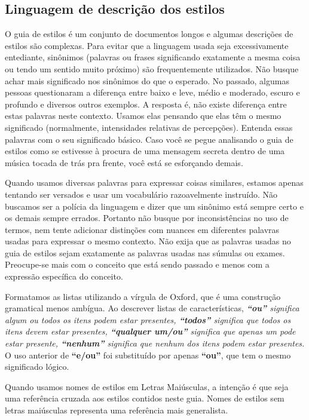 \subsection*{Linguagem de descrição dos estilos}
O guia de estilos é um conjunto de documentos longos e algumas descrições de estilos são complexas. Para evitar que a linguagem usada seja excessivamente entediante, sinônimos (palavras ou frases significando exatamente a mesma coisa ou tendo um sentido muito próximo) são frequentemente utilizados. Não busque achar mais significado nos sinônimos do que o esperado. No passado, algumas pessoas questionaram a diferença entre baixo e leve, médio e moderado, escuro e profundo e diversos outros exemplos. A resposta é, não existe diferença entre estas palavras neste contexto. Usamos elas pensando que elas têm o mesmo significado (normalmente, intensidades relativas de percepções). Entenda essas palavras com o seu significado básico. Caso você se pegue analisando o guia de estilos como se estivesse à procura de uma mensagem secreta dentro de uma música tocada de trás pra frente, você está se esforçando demais.

Quando usamos diversas palavras para expressar coisas similares, estamos apenas tentando ser versados e usar um vocabulário razoavelmente instruído. Não buscamos ser a polícia da linguagem e dizer que um sinônimo está sempre certo e os demais sempre errados. Portanto não busque por inconsistências no uso de termos, nem tente adicionar distinções com nuances em diferentes palavras usadas para expressar o mesmo contexto. Não exija que as palavras usadas no guia de estilos sejam exatamente as palavras usadas nas súmulas ou exames. Preocupe-se mais com o conceito que está sendo passado e menos com a expressão específica do conceito.

Formatamos as listas utilizando a vírgula de Oxford, que é uma construção gramatical menos ambígua. Ao descrever listas de características, \textit{\textbf{“ou”} significa algum ou todos os itens podem estar presentes, \textbf{“todos”} significa que todos os itens devem estar presentes, \textbf{“qualquer um/ou”} significa que apenas um pode estar presente, \textbf{“nenhum”} significa que nenhum dos itens podem estar presentes.} O uso anterior de \textbf{“e/ou”} foi substituído por apenas \textbf{“ou”}, que tem o mesmo significado lógico.

Quando usamos nomes de estilos em Letras Maiúsculas, a intenção é que seja uma referência cruzada aos estilos contidos neste guia. Nomes de estilos sem letras maiúsculas representa uma referência mais generalista.

